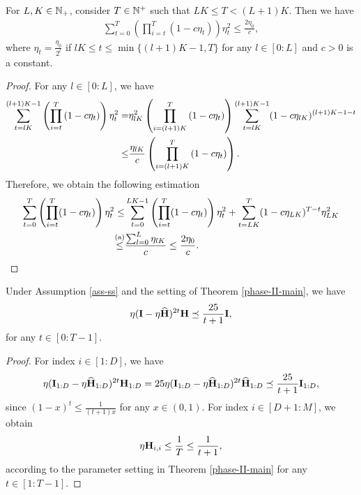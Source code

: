 \begin{lemma}\label{aux-3}
    For $L,K\in\mathbb{N}_+$, consider $T\in\mathbb{N}^+$ such that $LK\leq T<(L+1)K$. Then we have 
    \begin{align}
        \sum_{t=0}^{T}\left(\prod_{i=t}^{T}(1-c\eta_t)\right)\eta_t^2\leq\frac{2\eta_0}{c},
    \end{align}
    where $\eta_t=\frac{\eta_0}{2^l}$ if $lK\leq t\leq \min\{(l+1)K-1,T\}$ for any $l\in[0:L]$ and $c>0$ is a constant.
\end{lemma}
\begin{proof}
    For any $l\in[0:L]$, we have
    \begin{align}\label{aux-eq-lemma3}
        \sum_{t=lK}^{(l+1)K-1}\left(\prod_{i=t}^{T}\left(1-c\eta_t\right)\right)\eta_t^2=&\eta_{lK}^2\left(\prod_{i=(l+1)K}^{T}\left(1-c\eta_t\right)\right)\sum_{t=lK}^{(l+1)K-1}(1-c\eta_{lK})^{(l+1)K-1-t}\notag
        \\
        \leq&\frac{\eta_{lK}}{c}\left(\prod_{i=(l+1)K}^{T}\left(1-c\eta_t\right)\right).
    \end{align}
    Therefore, we obtain the following estimation
    \begin{align}
        \sum_{t=0}^{T}\left(\prod_{i=t}^{T}(1-c\eta_t)\right)\eta_t^2\leq&\sum_{t=0}^{LK-1}\left(\prod_{i=t}^{T}(1-c\eta_t)\right)\eta_t^2+\sum_{t=LK}^T(1-c\eta_{LK})^{T-t}\eta_{LK}^2\notag
        \\
        \overset{\text{(a)}}{\leq}&\frac{\sum_{l=0}^L\eta_{lK}}{c}\leq\frac{2\eta_0}{c}.
    \end{align}
\end{proof}

    

\begin{lemma}\label{aux-5}
    Under Assumption \ref{ass-ss} and the setting of Theorem \ref{phase-II-main}, we have 
    $$
    \eta(\mathbf{I}-\eta\widehat{\mathbf{H}})^{2t}\mathbf{H}\preceq\frac{25}{t+1}\mathbf{I},
    $$
    for any $t\in[0:T-1]$.
\end{lemma}
\begin{proof}
    For index $i\in[1:D]$, we have 
    \begin{align}
    \eta(\mathbf{I}_{1:D}-\eta\widehat{\mathbf{H}}_{1:D})^{2t}\mathbf{H}_{1:D}=25 \eta(\mathbf{I}_{1:D}-\eta\widehat{\mathbf{H}}_{1:D})^{2t}\widehat{\mathbf{H}}_{1:D}\preceq\frac{25}{t+1}\mathbf{I}_{1:D},\notag
    \end{align}
    since $(1-x)^t\leq\frac{1}{(t+1)x}$ for any $x\in(0,1)$. For index $i\in[D+1:M]$, we obtain 
    \begin{align}
        \eta\mathbf{H}_{i,i}\leq\frac{1}{T}\leq\frac{1}{t+1},
    \end{align}
    according to the parameter setting in Theorem \ref{phase-II-main} for any $t\in[1:T-1]$.
\end{proof}

